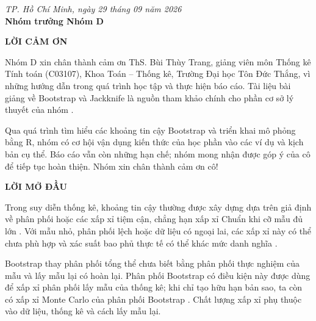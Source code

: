 	\begin{flushright}
		\textit{TP. Hồ Chí Minh, ngày 29 tháng 09 năm 2026}\\[0.2cm]
		\textbf{Nhóm trưởng Nhóm D}\\[1.2cm]
	\end{flushright}
	
	\newpage
	

	\begin{center}
		{\Large\bfseries LỜI CẢM ƠN}
	\end{center}

	\vspace{0.5cm}
	Nhóm D xin chân thành cảm ơn ThS. Bùi Thùy Trang, giảng viên môn Thống kê Tính toán (C03107), Khoa Toán – Thống kê, Trường Đại học Tôn Đức Thắng, vì những hướng dẫn trong quá trình học tập và thực hiện báo cáo. Tài liệu bài giảng về Bootstrap và Jackknife là nguồn tham khảo chính cho phần cơ sở lý thuyết của nhóm \cite{buithuytrang2026}.

Qua quá trình tìm hiểu các khoảng tin cậy Bootstrap và triển khai mô phỏng bằng R, nhóm có cơ hội vận dụng kiến thức của học phần vào các ví dụ và kịch bản cụ thể. Báo cáo vẫn còn những hạn chế; nhóm mong nhận được góp ý của cô để tiếp tục hoàn thiện. Nhóm xin chân thành cảm ơn cô!

	\newpage
	

	\begin{center}
		{\Large\bfseries LỜI MỞ ĐẦU}
	\end{center}

	\vspace{0.5cm}
	Trong suy diễn thống kê, khoảng tin cậy thường được xây dựng dựa trên giả định về phân phối hoặc các xấp xỉ tiệm cận, chẳng hạn xấp xỉ Chuẩn khi cỡ mẫu đủ lớn \cite{buithuytrang2026}. Với mẫu nhỏ, phân phối lệch hoặc dữ liệu có ngoại lai, các xấp xỉ này có thể chưa phù hợp và xác suất bao phủ thực tế có thể khác mức danh nghĩa \cite{efron1993, davison1997}.

Bootstrap thay phân phối tổng thể chưa biết bằng phân phối thực nghiệm của mẫu và lấy mẫu lại có hoàn lại. Phân phối Bootstrap có điều kiện này được dùng để xấp xỉ phân phối lấy mẫu của thống kê; khi chỉ tạo hữu hạn bản sao, ta còn có xấp xỉ Monte Carlo của phân phối Bootstrap \cite{efron1979, efron1993}. Chất lượng xấp xỉ phụ thuộc vào dữ liệu, thống kê và cách lấy mẫu lại.

